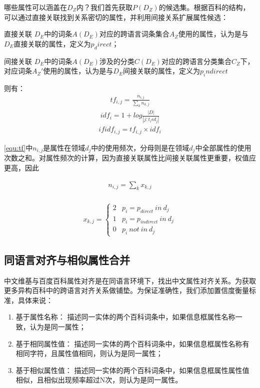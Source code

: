 哪些属性可以涵盖在$D_Z$内？我们首先获取$P(D_Z)$的候选集。根据百科的结构，可以通过直接关联找到关系密切的属性，并利用间接关系扩展属性候选：

{\heiti 直接关联} $D_E$中的词条$A(D_E)$对应的跨语言词条集合$A_Z$使用的属性，认为是与$D_E$直接关联的属性，定义为$p_direct$；

{\heiti 间接关联} $D_E$中的词条$A(D_E)$涉及的分类$C(D_E)$对应的跨语言分类集合$C_Z$下，对应词条$A_Z'$使用的属性，认为是与$D_E$间接关联的属性，定义为$p_indirect$

则有：
\begin{align}
\label{equ:tf}
tf_{i,j}=\frac{n_{i,j}}{\sum_{k}{n_{k,j}}} 
\end{align}
\begin{align}
\label{equ:idf}
idf_{i}=1+log\frac{\left | D \right |}{\left | j:t_i  \epsilon d_j \right |} 
\end{align}
\begin{align}
\label{equ:tfidf}
ifidf_{i,j}=tf_{i,j}\times idf_{i}
\end{align}

\ref{equ:tf}中$n_{i,j}$是属性在领域$d_{j}$中的使用频次，分母则是在领域$d_{j}$中全部属性的使用次数之和。对属性频次的计算，因为直接关联属性比间接关联属性更重要，权值应更高，因此

\begin{align}
n_{i,j} = {\sum_{k}{x_{k,j}}}\\
\end{align}

\begin{align}
x_{k,j} = 
\left\{\begin{matrix}
2 & p_i = p_{direct} \ in \ d_j\\
1 & p_i = p_{indirect} \ in \ d_j\\
0 & p_i \ not \ in \ d_j
\end{matrix}\right.
\end{align}

\subsection{同语言对齐与相似属性合并}
\label{sec:similar-property}

{\heiti 中文维基与百度百科属性对齐}是在同语言环境下，找出中文属性对齐关系。为获取更多异构百科中的跨语言对齐关系做铺垫。为保证准确性，我们添加置信度衡量标准，具体来说：

\begin{enumerate}[1)]
\item {\heiti 基于属性名称：}   描述同一实体的两个百科词条中，如果信息框属性名称一致，认为是同一属性；
\item {\heiti 基于相同属性值：} 描述同一实体的两个百科词条中，如果信息框属性名称有相同字符，且属性值相同，则认为是同一属性；
\item {\heiti 基于相似属性值：} 描述同一实体的两个百科词条中，如果信息框属性属性值相似，且相似出现频率超过N次，则认为是同一属性。
\end{enumerate}


